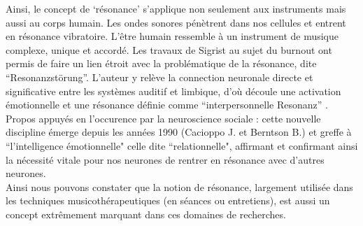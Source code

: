 Ainsi, le concept de `résonance' s'applique non seulement aux instruments mais aussi au corps humain. 
Les ondes sonores pénètrent dans nos cellules et entrent en résonance vibratoire. L'être humain 
ressemble à un instrument de musique complexe, unique et accordé.
Les travaux de Sigrist au sujet du burnout ont permis de faire un lien étroit avec la problématique de la
 résonance, dite \enquote{Resonanzstörung}.
L'auteur y relève la connection neuronale
directe et significative entre les systèmes auditif et
         limbique, d'où découle une activation émotionnelle et une
         résonance définie comme
         \enquote{interpersonnelle Resonanz} \autocite[55-90] {sigrist_burnout_2016}.
Propos appuyés en l'occurence par la neuroscience sociale \autocite[201]{van_eersel_cerveau}:  
cette nouvelle discipline émerge depuis
les années 1990 (Cacioppo J. et Berntson B.) et greffe à ``l'intelligence
émotionnelle" celle dite ``relationnelle", affirmant et confirmant ainsi la nécessité vitale pour nos 
neurones  de rentrer en
 résonance avec d'autres neurones.
\\
Ainsi nous pouvons constater que la notion de résonance, largement utilisée dans les techniques  
musicothérapeutiques (en séances ou entretiens),   est 
aussi un concept extrêmement marquant dans ces  domaines de 
recherches. 






